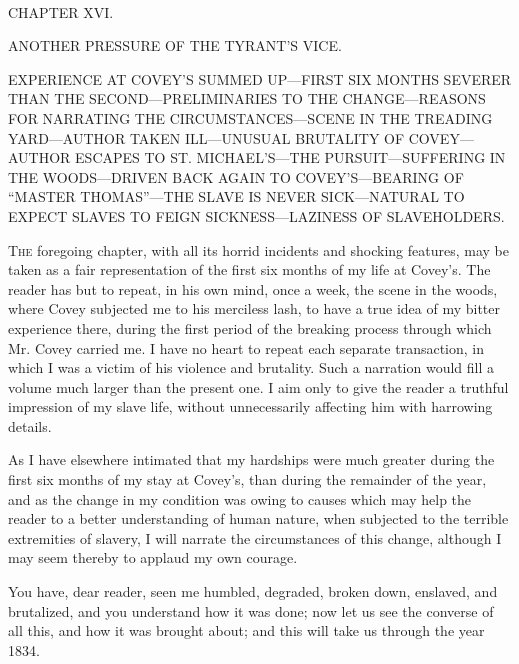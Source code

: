 {}

~

{CHAPTER XVI.}

ANOTHER PRESSURE OF THE TYRANT'S VICE.

{EXPERIENCE AT COVEY'S SUMMED UP---FIRST SIX MONTHS SEVERER THAN THE
SECOND---PRELIMINARIES TO THE CHANGE---REASONS FOR NARRATING THE
CIRCUMSTANCES---SCENE IN THE TREADING YARD---AUTHOR TAKEN ILL---UNUSUAL
BRUTALITY OF COVEY---AUTHOR ESCAPES TO ST. MICHAEL'S---THE
PURSUIT---SUFFERING IN THE WOODS---DRIVEN BACK AGAIN TO
COVEY'S---BEARING OF ``MASTER THOMAS''---THE SLAVE IS NEVER
SICK---NATURAL TO EXPECT SLAVES TO FEIGN SICKNESS---LAZINESS OF
SLAVEHOLDERS.}

\textsc{The} foregoing chapter, with all its horrid incidents and
shocking features, may be taken as a fair representation of the first
six months of my life at Covey's. The reader has but to repeat, in his
own mind, once a week, the scene in the woods, where Covey subjected me
to his merciless lash, to have a true idea of my bitter experience
there, during the first period of the breaking process through which Mr.
Covey carried me. I have no heart to repeat each separate transaction,
in which I was a victim of his violence and brutality. Such a narration
would fill a volume much larger than the present one. I aim only to give
the reader a truthful impression of my slave life, without unnecessarily
affecting him with harrowing details.

As I have elsewhere intimated that my hardships were much greater during
the first six months of my stay at Covey's, than during the remainder of
the year, {}and as the change in my condition was owing to causes which
may help the reader to a better understanding of human nature, when
subjected to the terrible extremities of slavery, I will narrate the
circumstances of this change, although I may seem thereby to applaud my
own courage.

You have, dear reader, seen me humbled, degraded, broken down, enslaved,
and brutalized, and you understand how it was done; now let us see the
converse of all this, and how it was brought about; and this will take
us through the year 1834.

